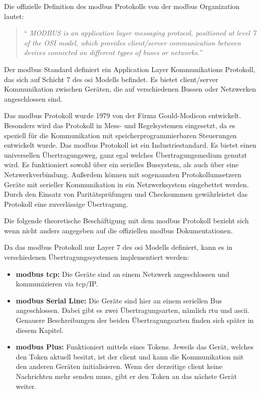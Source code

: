 \label{modbus_kapitel}
Die offizielle Definition des \gls{modbus} Protokolls von der \gls{modbus} Organization \cite[vgl.][]{Modbus_Organization_AP:2012} lautet:
\begin{quotation}
	\enquote{\emph{
			MODBUS is an application layer messaging protocol, positioned at level 7 of the OSI model, which provides client/server communication between devices connected on different types of buses or networks.}}
\end{quotation}

Der \gls{modbus} Standard definiert ein Application Layer Kommunikations Protokoll, das sich auf Schicht 7 des \gls{osi} Modells befindet. Es bietet \gls{client}/\gls{server} Kommunikation zwischen Geräten, die auf verschiedenen Bussen oder Netzwerken angeschlossen sind.

Das \gls{modbus} Protokoll wurde 1979 von der Firma Gould-Modicon entwickelt. Besonders wird das Protokoll in Mess- und Regelsystemen eingesetzt, da es speziell für die Kommunikation mit speicherprogrammierbaren Steuerungen entwickelt wurde. Das \gls{modbus} Protokoll ist ein Industriestandard. Es bietet einen universellen Übertragungsweg, ganz egal welches Übertragungsmedium genutzt wird. Es funktioniert sowohl über ein serielles Bussystem, als auch über eine Netzwerkverbindung. Außerdem können mit sogenannten Protokollumsetzern Geräte mit serieller Kommunikation in ein Netzwerksystem eingebettet werden. Durch den Einsatz von Paritätsprüfungen und Checksummen gewährleistet das Protokoll eine zuverlässige Übertragung. \cite[vgl.][]{KUNBUS_GmbH:o.J., kvm-concepts_GmbH:2022}


Die folgende theoretische Beschäftigung mit dem \gls{modbus} Protokoll bezieht sich wenn nicht anders angegeben auf die offiziellen \gls{modbus} Dokumentationen. \cite[vgl.][]{Modbus_Organization_AP:2012, Modbus_Organization_SL:2012}

Da das \gls{modbus} Protokoll nur Layer 7 des \gls{osi} Modells definiert, kann es in verschiedenen Übertragungssystemen implementiert werden:
\begin{itemize}
	\item \textbf{\gls{modbus} \acs{tcp}:} Die Geräte sind an einem Netzwerk angeschlossen und kommunizieren via \acs{tcp}/IP.
	\item \textbf{\gls{modbus} Serial Line:} Die Geräte sind hier an einem seriellen Bus angeschlossen. Dabei gibt es zwei Übertragungsarten, nämlich \acs{rtu} und \acs{ascii}. Genauere Beschreibungen der beiden Übertragungsarten finden sich später in diesem Kapitel.
	\item \textbf{\gls{modbus} Plus:} Funktioniert mittels eines Tokens. Jeweils das Gerät, welches den Token aktuell besitzt, ist der \gls{client} und kann die Kommunikation mit den anderen Geräten initialisieren. Wenn der derzeitige \gls{client} keine Nachrichten mehr senden muss, gibt er den Token an das nächste Gerät weiter. \cite[vgl.][]{Rinaldi:2016}
\end{itemize}

